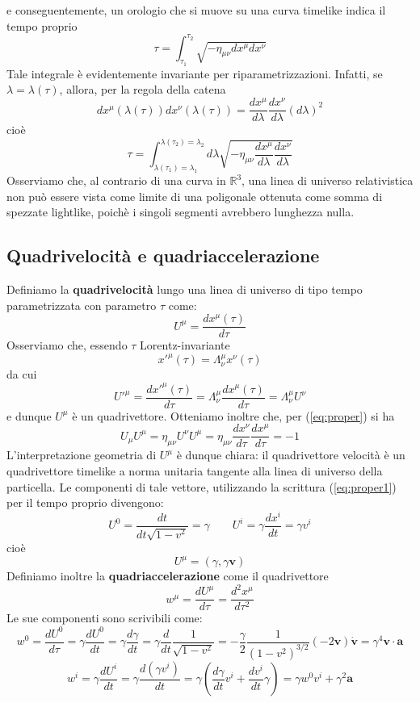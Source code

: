 \documentclass[a4paper,11pt]{book}
\theoremstyle{plain}
\theoremstyle{definition}
\begin{document}
e conseguentemente, un orologio che si muove su una curva timelike indica il tempo proprio
\[
\tau=\int_{\tau_1}^{\tau_2} \sqrt{-\eta_{\mu\nu}dx^{\mu}dx^{\nu}}
\]
Tale integrale è evidentemente invariante per riparametrizzazioni. Infatti, se $\lambda = \lambda(\tau)$, allora, per la regola della catena
\[
dx^{\mu}(\lambda(\tau))dx^{\nu}(\lambda(\tau))=\frac{dx^{\mu}}{d\lambda}\frac{dx^{\nu}}{d\lambda}(d\lambda)^2
\]
cioè
\[
\tau = \int_{\lambda(\tau_1)=\lambda_1}^{\lambda(\tau_2)=\lambda_2} d\lambda\sqrt{-\eta_{\mu\nu}\frac{dx^{\mu}}{d\lambda}\frac{dx^{\nu}}{d\lambda}}
\]
Osserviamo che, al contrario di una curva in $\mathbb{R}^3$, una linea di universo relativistica non può essere vista come limite di una poligonale ottenuta come somma di spezzate lightlike, poichè i singoli segmenti avrebbero lunghezza nulla. 

\subsection{Quadrivelocità e quadriaccelerazione}
Definiamo la \textbf{quadrivelocità} lungo una linea di universo di tipo tempo parametrizzata con parametro $\tau$ come:
\[
U^{\mu} = \frac{dx^{\mu}(\tau)}{d\tau}
\]
Osserviamo che, essendo $\tau$ Lorentz-invariante
\[
x'^{\mu}(\tau) = \Lambda_{\nu}^{\mu}x^{\nu}(\tau)
\]
da cui
\[
U'^{\mu} = \frac{dx'^{\mu}(\tau)}{d\tau} = \Lambda _{\nu}^{\mu} \frac{dx^{\mu}(\tau)}{d\tau} = \Lambda_{\nu}^{\mu}U^{\nu}
\]
e dunque $U^{\mu}$ è un quadrivettore. Otteniamo inoltre che, per (\ref{eq:proper}) si ha
\[
U_{\mu}U^{\mu}=\eta_{\mu\nu}U^{\nu}U^{\mu}=\eta_{\mu\nu} \frac{dx^{\nu}}{d\tau}\frac{dx^{\mu}}{d\tau}=-1
\]
L'interpretazione geometria di $U^{\mu}$ è dunque chiara: il quadrivettore velocità è un quadrivettore timelike a norma unitaria tangente alla linea di universo della particella. Le componenti di tale vettore, utilizzando la scrittura (\ref{eq:proper1}) per il tempo proprio divengono:
\[
U^0 = \frac{dt}{dt\sqrt{1-v^2}}=\gamma \qquad U^i = \gamma \frac{dx^i}{dt}=\gamma v^i
\]
cioè 
\[
U^{\mu} = (\gamma, \gamma\textbf{v})
\]
Definiamo inoltre la \textbf{quadriaccelerazione} come il quadrivettore
\[
w^{\mu}=\frac{dU^{\mu}}{d\tau}=\frac{d^2x^{\mu}}{d\tau^2}
\]
Le sue componenti sono scrivibili come:
\[
w^0 = \frac{dU^0}{d\tau}=\gamma \frac{dU^0}{dt}=\gamma \frac{d\gamma}{dt} = \gamma \frac{d}{dt}\frac{1}{\sqrt{1-v^2}}=-\frac{\gamma}{2}\frac{1}{(1-v^2)^{3/2}}(-2\textbf{v})\dot {\textbf{v}}=\gamma^4\textbf{v}\cdot \textbf{a}
\]
\[
w^i = \gamma \frac{dU^i}{dt}=\gamma \frac{d(\gamma v^i)}{dt} = \gamma\left( \frac{d\gamma}{dt}v^i+\frac{dv^i}{dt}\gamma \right) = \gamma w^0v^i+\gamma^2\textbf{a}
\]
\end{document}
